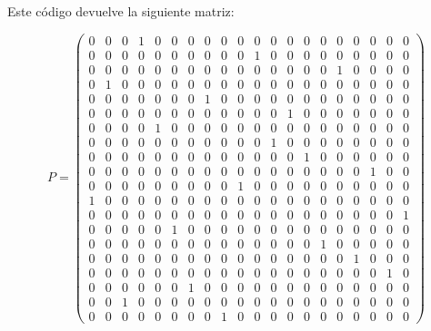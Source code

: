 \begin{exampleth}
    Este código devuelve la siguiente matriz:

    \[
        P = \left(\begin{array}{rrrrrrrrrrrrrrrrrrrr}
            0 & 0 & 0 & 1 & 0 & 0 & 0 & 0 & 0 & 0 & 0 & 0 & 0 & 0 & 0 & 0 & 0 & 0 & 0 & 0 \\
            0 & 0 & 0 & 0 & 0 & 0 & 0 & 0 & 0 & 0 & 1 & 0 & 0 & 0 & 0 & 0 & 0 & 0 & 0 & 0 \\
            0 & 0 & 0 & 0 & 0 & 0 & 0 & 0 & 0 & 0 & 0 & 0 & 0 & 0 & 0 & 1 & 0 & 0 & 0 & 0 \\
            0 & 1 & 0 & 0 & 0 & 0 & 0 & 0 & 0 & 0 & 0 & 0 & 0 & 0 & 0 & 0 & 0 & 0 & 0 & 0 \\
            0 & 0 & 0 & 0 & 0 & 0 & 0 & 1 & 0 & 0 & 0 & 0 & 0 & 0 & 0 & 0 & 0 & 0 & 0 & 0 \\
            0 & 0 & 0 & 0 & 0 & 0 & 0 & 0 & 0 & 0 & 0 & 0 & 1 & 0 & 0 & 0 & 0 & 0 & 0 & 0 \\
            0 & 0 & 0 & 0 & 1 & 0 & 0 & 0 & 0 & 0 & 0 & 0 & 0 & 0 & 0 & 0 & 0 & 0 & 0 & 0 \\
            0 & 0 & 0 & 0 & 0 & 0 & 0 & 0 & 0 & 0 & 0 & 1 & 0 & 0 & 0 & 0 & 0 & 0 & 0 & 0 \\
            0 & 0 & 0 & 0 & 0 & 0 & 0 & 0 & 0 & 0 & 0 & 0 & 0 & 1 & 0 & 0 & 0 & 0 & 0 & 0 \\
            0 & 0 & 0 & 0 & 0 & 0 & 0 & 0 & 0 & 0 & 0 & 0 & 0 & 0 & 0 & 0 & 0 & 1 & 0 & 0 \\
            0 & 0 & 0 & 0 & 0 & 0 & 0 & 0 & 0 & 1 & 0 & 0 & 0 & 0 & 0 & 0 & 0 & 0 & 0 & 0 \\
            1 & 0 & 0 & 0 & 0 & 0 & 0 & 0 & 0 & 0 & 0 & 0 & 0 & 0 & 0 & 0 & 0 & 0 & 0 & 0 \\
            0 & 0 & 0 & 0 & 0 & 0 & 0 & 0 & 0 & 0 & 0 & 0 & 0 & 0 & 0 & 0 & 0 & 0 & 0 & 1 \\
            0 & 0 & 0 & 0 & 0 & 1 & 0 & 0 & 0 & 0 & 0 & 0 & 0 & 0 & 0 & 0 & 0 & 0 & 0 & 0 \\
            0 & 0 & 0 & 0 & 0 & 0 & 0 & 0 & 0 & 0 & 0 & 0 & 0 & 0 & 1 & 0 & 0 & 0 & 0 & 0 \\
            0 & 0 & 0 & 0 & 0 & 0 & 0 & 0 & 0 & 0 & 0 & 0 & 0 & 0 & 0 & 0 & 1 & 0 & 0 & 0 \\
            0 & 0 & 0 & 0 & 0 & 0 & 0 & 0 & 0 & 0 & 0 & 0 & 0 & 0 & 0 & 0 & 0 & 0 & 1 & 0 \\
            0 & 0 & 0 & 0 & 0 & 0 & 1 & 0 & 0 & 0 & 0 & 0 & 0 & 0 & 0 & 0 & 0 & 0 & 0 & 0 \\
            0 & 0 & 1 & 0 & 0 & 0 & 0 & 0 & 0 & 0 & 0 & 0 & 0 & 0 & 0 & 0 & 0 & 0 & 0 & 0 \\
            0 & 0 & 0 & 0 & 0 & 0 & 0 & 0 & 1 & 0 & 0 & 0 & 0 & 0 & 0 & 0 & 0 & 0 & 0 & 0
            \end{array}\right)
    \]


\end{exampleth}
